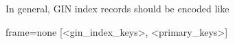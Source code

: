 In general, GIN index records should be encoded like

\begin{textcode*}{frame=none}
[<gin_index_keys>, <primary_keys>]
\end{textcode*}
